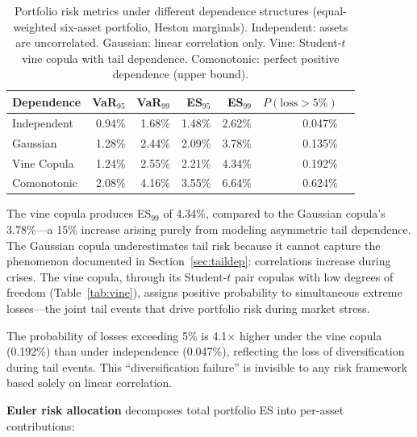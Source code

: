 \documentclass[11pt,a4paper]{article}
\begin{document}
\begin{table}[H]
\centering
\caption{Portfolio risk metrics under different dependence structures (equal-weighted six-asset portfolio, Heston marginals). Independent: assets are uncorrelated. Gaussian: linear correlation only. Vine: Student-$t$ vine copula with tail dependence. Comonotonic: perfect positive dependence (upper bound).}
\label{tab:copula_risk}
\small
\begin{tabular}{@{}lrrrrrr@{}}
\toprule
\textbf{Dependence} & \textbf{VaR$_{95}$} & \textbf{VaR$_{99}$} & \textbf{ES$_{95}$} & \textbf{ES$_{99}$} & $P(\text{loss}>5\%)$ \\
\midrule
Independent   & 0.94\% & 1.68\% & 1.48\% & 2.62\% & 0.047\% \\
Gaussian      & 1.28\% & 2.44\% & 2.09\% & 3.78\% & 0.135\% \\
Vine Copula   & 1.24\% & 2.55\% & 2.21\% & 4.34\% & 0.192\% \\
Comonotonic   & 2.08\% & 4.16\% & 3.55\% & 6.64\% & 0.624\% \\
\bottomrule
\end{tabular}
\end{table}

The vine copula produces ES$_{99}$ of 4.34\%, compared to the Gaussian copula's 3.78\%---a 15\% increase arising purely from modeling asymmetric tail dependence.
The Gaussian copula underestimates tail risk because it cannot capture the phenomenon documented in Section~\ref{sec:taildep}: correlations increase during crises.
The vine copula, through its Student-$t$ pair copulas with low degrees of freedom (Table~\ref{tab:vine}), assigns positive probability to simultaneous extreme losses---the joint tail events that drive portfolio risk during market stress.

The probability of losses exceeding 5\% is 4.1$\times$ higher under the vine copula (0.192\%) than under independence (0.047\%), reflecting the loss of diversification during tail events.
This ``diversification failure'' is invisible to any risk framework based solely on linear correlation.

\textbf{Euler risk allocation} decomposes total portfolio ES into per-asset contributions:
\end{document}
